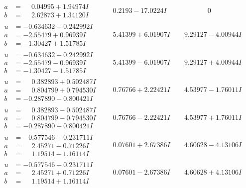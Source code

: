 \documentclass[1p]{elsarticle_modified}
\theoremstyle{definition}
\begin{document}
$$\begin{array}{c|c|c}
\begin{aligned}
a &= \phantom{-}0.04995 + 1.94974 I \\
b &= \phantom{-}2.62873 + 1.34120 I\end{aligned}
 & \phantom{-}0.2193 - 17.0224 I & \phantom{-0.000000 } 0 \\ \hline\begin{aligned}
u &= -0.634632 + 0.242992 I \\
a &= -2.55479 + 0.96939 I \\
b &= -1.30427 + 1.51785 I\end{aligned}
 & \phantom{-}5.41399 + 6.01907 I & \phantom{-}9.29127 - 4.00944 I \\ \hline\begin{aligned}
u &= -0.634632 - 0.242992 I \\
a &= -2.55479 - 0.96939 I \\
b &= -1.30427 - 1.51785 I\end{aligned}
 & \phantom{-}5.41399 - 6.01907 I & \phantom{-}9.29127 + 4.00944 I \\ \hline\begin{aligned}
u &= \phantom{-}0.382893 + 0.502487 I \\
a &= \phantom{-}0.804799 + 0.794530 I \\
b &= -0.287890 - 0.800421 I\end{aligned}
 & \phantom{-}0.76766 + 2.22421 I & \phantom{-}4.53977 - 1.76011 I \\ \hline\begin{aligned}
u &= \phantom{-}0.382893 - 0.502487 I \\
a &= \phantom{-}0.804799 - 0.794530 I \\
b &= -0.287890 + 0.800421 I\end{aligned}
 & \phantom{-}0.76766 - 2.22421 I & \phantom{-}4.53977 + 1.76011 I \\ \hline\begin{aligned}
u &= -0.577546 + 0.231711 I \\
a &= \phantom{-}2.45271 - 0.71226 I \\
b &= \phantom{-}1.19514 - 1.16114 I\end{aligned}
 & \phantom{-}0.07601 + 2.67386 I & \phantom{-}4.60628 - 4.13106 I \\ \hline\begin{aligned}
u &= -0.577546 - 0.231711 I \\
a &= \phantom{-}2.45271 + 0.71226 I \\
b &= \phantom{-}1.19514 + 1.16114 I\end{aligned}
 & \phantom{-}0.07601 - 2.67386 I & \phantom{-}4.60628 + 4.13106 I\\

\end{array}$$
\end{document}
